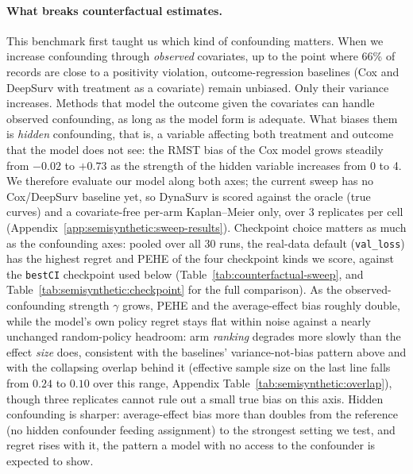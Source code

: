 \documentclass[a4paper,10pt]{article}
\begin{document}
\paragraph{What breaks counterfactual estimates.} This benchmark first taught us which kind of confounding matters. When we increase confounding through \emph{observed} covariates, up to the point where 66\% of records are close to a positivity violation, outcome-regression baselines (Cox and DeepSurv with treatment as a covariate) remain unbiased. Only their variance increases. Methods that model the outcome given the covariates can handle observed confounding, as long as the model form is adequate. What biases them is \emph{hidden} confounding, that is, a variable affecting both treatment and outcome that the model does not see: the RMST bias of the Cox model grows steadily from $-0.02$ to $+0.73$ as the strength of the hidden variable increases from 0 to 4. We therefore evaluate our model along both axes; the current sweep has no Cox/DeepSurv baseline yet, so DynaSurv is scored against the oracle (true curves) and a covariate-free per-arm Kaplan--Meier only, over 3 replicates per cell (Appendix~\ref{app:semisynthetic:sweep-results}). Checkpoint choice matters as much as the confounding axes: pooled over all 30 runs, the real-data default (\texttt{val\_loss}) has the highest regret and PEHE of the four checkpoint kinds we score, against the \texttt{bestCI} checkpoint used below (Table~\ref{tab:counterfactual-sweep}, and Table~\ref{tab:semisynthetic:checkpoint} for the full comparison). As the observed-confounding strength $\gamma$ grows, PEHE and the average-effect bias roughly double, while the model's own policy regret stays flat within noise against a nearly unchanged random-policy headroom: arm \emph{ranking} degrades more slowly than the effect \emph{size} does, consistent with the baselines' variance-not-bias pattern above and with the collapsing overlap behind it (effective sample size on the last line falls from $0.24$ to $0.10$ over this range, Appendix Table~\ref{tab:semisynthetic:overlap}), though three replicates cannot rule out a small true bias on this axis. Hidden confounding is sharper: average-effect bias more than doubles from the reference (no hidden confounder feeding assignment) to the strongest setting we test, and regret rises with it, the pattern a model with no access to the confounder is expected to show.
\end{document}
